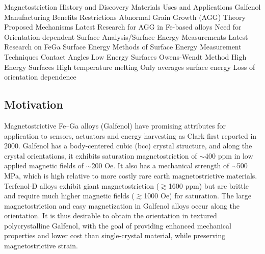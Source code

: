 \begin{outline}[enumerate]
\1 Magnetostriction
	\2 History and Discovery
	\2 Materials
	\2 Uses and Applications
\1 Galfenol
	\2 Manufacturing 
	\2 Benefits
	\2 Restrictions
\1 Abnormal Grain Growth (AGG)
	\2 Theory
	\2 Proposed Mechanisms
	\2 Latest Research for AGG in Fe-based alloys
	\2 Need for Orientation-dependent Surface Analysis/Surface Energy Measurements
		\3 Latest Research on FeGa Surface Energy 
\1 Methods of Surface Energy Measurement Techniques
	\2 Contact Angles
		\3 Low Energy Surfaces
			\4 Owens-Wendt Method
		\3 High Energy Surfaces
			\3 High temperature melting
				\4 Only averages surface energy
				\4 Loss of orientation dependence
 
\end{outline}


\subsection{Motivation}\label{abnormal-grain-growth}
%

 Magnetostrictive Fe–Ga alloys (Galfenol) have promising attributes for application to sensors, actuators and energy harvesting as Clark \etal first reported in 2000\cite{clark2000magnetostrictive}. Galfenol has a body-centered cubic (bcc) crystal structure, and along the  crystal orientations, it exhibits saturation magnetostriction of $\sim$400 ppm in low applied magnetic fields of $\sim$200 Oe. It also has a mechanical strength of $\sim$500 MPa, which is high relative to more costly rare earth magnetostrictive materials. Terfenol-D alloys exhibit giant magnetostriction ($\gtrsim$1600 ppm) but are brittle and require much higher magnetic fields ($\gtrsim$1000 Oe) for saturation\cite{clark2000magnetostrictive,Clark2003,Guruswamy2000}. The large magnetostriction and easy magnetization in Galfenol alloys occur along the  orientation. It is thus desirable to obtain the  orientation in textured polycrystalline Galfenol, with the goal of providing enhanced mechanical properties and lower cost than single-crystal material, while preserving magnetostrictive strain. 




